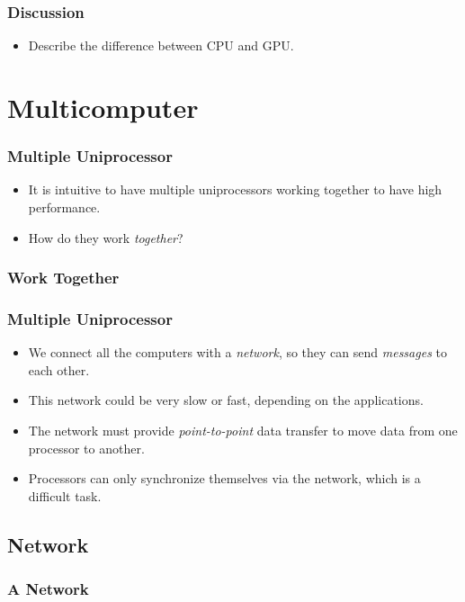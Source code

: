 \documentclass{beamer}
\begin{document}
\begin{CJK}{UTF8}{bsmi}
\begin{frame}
\frametitle{Discussion}
\begin{itemize}
\item Describe the difference between CPU and GPU.
\end{itemize}
\end{frame}


\section{Multicomputer}

\begin{frame}
\frametitle{Multiple Uniprocessor}
\begin{itemize}
\item It is intuitive to have multiple uniprocessors working together
  to have high performance.
\item How do they work {\em together}?
\end{itemize}
\end{frame}


\begin{frame}
\frametitle{Work Together}
\centerline{}
\end{frame}


\begin{frame}
\frametitle{Multiple Uniprocessor}
\begin{itemize}
\item We connect all the computers with a {\em network}, so they can
  send {\em messages} to each other.
\item This network could be very slow or fast, depending on the
  applications.
\item The network must provide {\em point-to-point} data transfer to
  move data from one processor to another.
\item Processors can only synchronize themselves via the network, which
  is a difficult task.
\end{itemize}
\end{frame}

\subsection{Network}

\begin{frame}
\frametitle{A Network}
\centerline{}
\end{frame}


\end{CJK}
\end{document}
